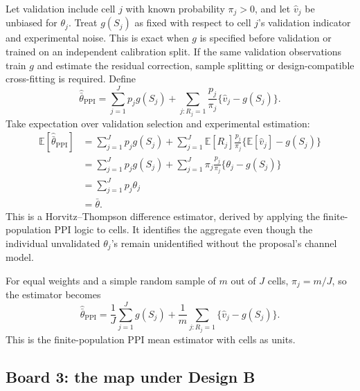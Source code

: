 \documentclass[11pt]{article}
\newcommand{\E}{\mathbb{E}}
\begin{document}
  Let validation include cell \(j\) with known probability \(\pi_j>0\), and let
  \(\widehat v_j\) be unbiased for \(\theta_j\). Treat \(g(S_j)\) as fixed with
  respect to cell \(j\)'s validation indicator and experimental noise. This is
  exact when \(g\) is specified before validation or trained on an independent
  calibration split. If the same validation observations train \(g\) and estimate
  the residual correction, sample splitting or design-compatible cross-fitting
  is required. Define
  \[
      \widehat{\bar\theta}_{\mathrm{PPI}}
      =
      \sum_{j=1}^Jp_jg(S_j)
      +
      \sum_{j:R_j=1}
      \frac{p_j}{\pi_j}
      \{\widehat v_j-g(S_j)\}.
  \]
  Take expectation over validation selection and experimental estimation:
  \begin{align*}
      \E[\widehat{\bar\theta}_{\mathrm{PPI}}]
      &=
      \sum_{j=1}^Jp_jg(S_j)
      +
      \sum_{j=1}^J
      \E[R_j]\frac{p_j}{\pi_j}
      \{\E[\widehat v_j]-g(S_j)\}\\
      &=
      \sum_{j=1}^Jp_jg(S_j)
      +
      \sum_{j=1}^J
      \pi_j\frac{p_j}{\pi_j}\{\theta_j-g(S_j)\}\\
      &=
      \sum_{j=1}^Jp_j\theta_j\\
      &=\bar\theta.
  \end{align*}
  This is a Horvitz--Thompson difference estimator, derived by applying the
  finite-population PPI logic to cells. It identifies the aggregate even though
  the individual unvalidated \(\theta_j\)'s remain unidentified without the
  proposal's channel model.
  
  For equal weights and a simple random sample of \(m\) out of \(J\) cells,
  \(\pi_j=m/J\), so the estimator becomes
  \[
      \widehat{\bar\theta}_{\mathrm{PPI}}
      =
      \frac{1}{J}\sum_{j=1}^Jg(S_j)
      +
      \frac{1}{m}\sum_{j:R_j=1}
      \{\widehat v_j-g(S_j)\}.
  \]
  This is the finite-population PPI mean estimator with cells as units.
  
  \subsection*{Board 3: the map under Design B}
  
\end{document}
